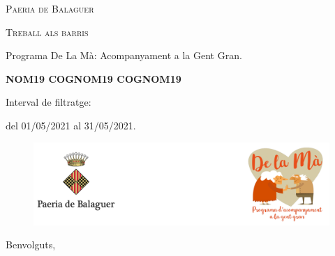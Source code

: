 \documentclass[a4paper,12pt]{elsarticle}  %
\begin{document}
 	


\begin{titlepage}
	\centering

	{\scshape\LARGE Paeria de Balaguer \par}


			\vfill


	{\scshape\Large Treball als barris\par}

	
			\vspace{0.5cm}

	
	{\Large Programa De La Mà: Acompanyament a la Gent Gran.\par}

			

			\vfill



	{\Large\bfseries NOM19 COGNOM19 COGNOM19 \par}
	


			\vfill



	{\large Interval de filtratge:\par}
	{\large del 01/05/2021 al 31/05/2021.\par}
		

\end{titlepage}



\clearpage







\FloatBarrier
\begin{figure}[h]
	\centering	
	\includegraphics[width=1\textwidth]{../IMATGES/logoPaeriaMa.png}
\end{figure}
\FloatBarrier	

\vfill









\noindent Benvolguts,

	\vspace{0.5cm}
\end{document}
